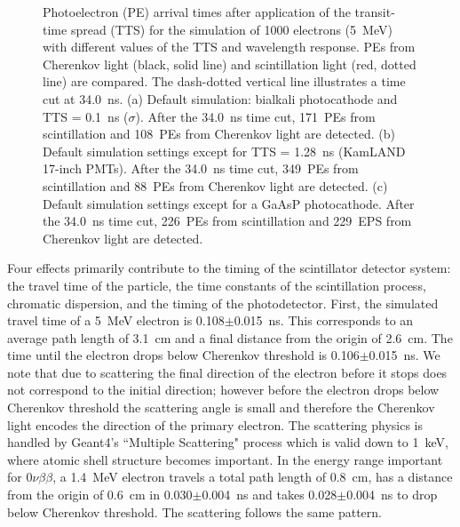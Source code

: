 \documentclass[cits]{JINST}
\begin{document}
\begin{figure}
\begin{center}
        \caption[]{Photoelectron (PE) arrival times after application
        of the transit-time spread (TTS) for the simulation
        of 1000 electrons (5~MeV) with different values of the TTS and
        wavelength response. PEs from
        Cherenkov light (black, solid line) and scintillation light
        (red, dotted line) are
        compared. The dash-dotted vertical line illustrates a time cut at
        34.0~ns. (a) Default simulation: bialkali photocathode and TTS =
        0.1~ns ($\sigma$). After the 34.0~ns time cut, 171~PEs
        from scintillation and 108~PEs from Cherenkov light are detected. (b)
        Default simulation settings except for TTS = 1.28~ns (KamLAND
        17-inch PMTs). After the 34.0~ns time cut, 349~PEs from
        scintillation and 88~PEs from Cherenkov light are detected. (c) Default
        simulation settings except for a GaAsP photocathode. After the
        34.0~ns time cut, 226~PEs from scintillation and 229~EPS
        from Cherenkov light are detected. \label{time_plots_comparison}}
        \end{center}
\end{figure}


Four effects primarily contribute to the timing of the scintillator detector
system: the travel time of the particle, the time constants of the scintillation process, chromatic dispersion, and the timing of the photodetector.  First, the simulated travel time of a 5~MeV electron is 0.108$\pm$0.015~ns. This corresponds to an average path length of 3.1~cm and a final distance from the origin of 2.6~cm. The time until the electron drops below Cherenkov threshold is 0.106$\pm$0.015~ns. We note that due to scattering the final direction of the electron before it stops does not correspond to the initial direction; however before the electron drops below Cherenkov threshold the scattering angle is small and therefore the Cherenkov light encodes the direction of the primary electron. The scattering physics is handled by Geant4's ``Multiple Scattering" process which is valid down to 1~keV, where atomic shell structure becomes important\cite{geant4scatt}. In the energy range important for $0\nu\beta\beta$, a 1.4~MeV electron travels a total path length of 0.8~cm, has a distance from the origin of 0.6~cm in 0.030$\pm$0.004~ns  and takes 0.028$\pm$0.004~ns to drop below Cherenkov threshold. The scattering follows the same pattern. 
\end{document}
